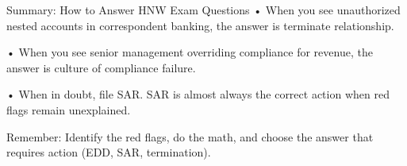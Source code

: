 \documentclass[11pt,a4paper]{beamer}
\begin{document}
\begin{frame}{Summary: How to Answer HNW Exam Questions}
		\vspace{0.1cm}
		\noindent• When you see unauthorized nested accounts in correspondent banking, the answer is terminate relationship.
		
		\vspace{0.1cm}
		\noindent• When you see senior management overriding compliance for revenue, the answer is culture of compliance failure.
		
		\vspace{0.1cm}
		\noindent• When in doubt, file SAR. SAR is almost always the correct action when red flags remain unexplained.
		
		\vspace{0.3cm}
		\centering
		{Remember: Identify the red flags, do the math, and choose the answer that requires action (EDD, SAR, termination).}
	\end{frame}
	
\end{document}
